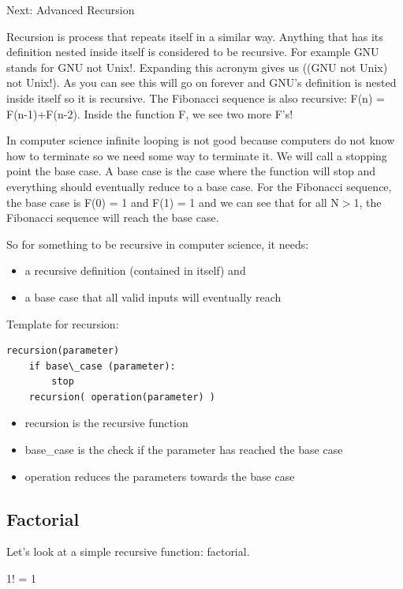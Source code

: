 \documentclass[11pt,oneside]{book}
\begin{document}
Next: Advanced Recursion

Recursion is process that repeats itself in a similar way. Anything that has its definition nested inside itself is considered to be recursive. For example GNU stands for GNU not Unix!. Expanding this acronym gives us ((GNU not Unix) not Unix!). As you can see this will go on forever and GNU's definition is nested inside itself so it is recursive. The Fibonacci sequence is also recursive: F(n) = F(n-1)+F(n-2). Inside the function F, we see two more F's!

In computer science infinite looping is not good because computers do not know how to terminate so we need some way to terminate it. We will call a stopping point the base case. A base case is the case where the function will stop and everything should eventually reduce to a base case. For the Fibonacci sequence, the base case is F(0) = 1 and F(1) = 1 and we can see that for all N$>$1, the Fibonacci sequence will reach the base case.

So for something to be recursive in computer science, it needs:

\begin{itemize}
\item a recursive definition (contained in itself) and 
\item a base case that all valid inputs will eventually reach
\end{itemize}

Template for recursion:

\begin{lstlisting}
recursion(parameter)
    if base\_case (parameter):
        stop
    recursion( operation(parameter) )
\end{lstlisting}

\begin{itemize}
\item recursion is the recursive function
\item base\_case is the check if the parameter has reached the base case
\item operation reduces the parameters towards the base case
\end{itemize}

\subsection{Factorial}

Let's look at a simple recursive function: factorial.

1! = 1
\end{document}
